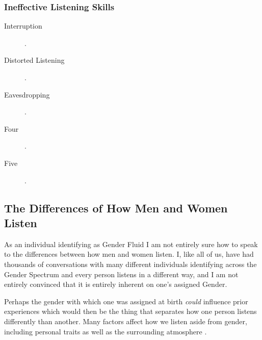 \documentclass[stu,12pt]{apa7}
\begin{document}
      \subsubsection{Ineffective Listening Skills}
          \begin{description}
            \item[Interruption]
              \parencite[pp. 351--352]{noauthor_communication_2013}.
            \item[Distorted Listening]
              \parencite[pp. 352]{noauthor_communication_2013}.
            \item[Eavesdropping]
              \parencite[pp. ]{noauthor_communication_2013}.
            \item[Four]
              \parencite[pp. ]{noauthor_communication_2013}.
            \item[Five]
              \parencite[pp. ]{noauthor_communication_2013}.
          \end{description}


    \subsection{The Differences of How Men and Women Listen}
      As an individual identifying as Gender Fluid I am not entirely sure how
        to speak to the differences between how men and women listen. I, like
        all of us, have had thousands of conversations with many different
        individuals identifying across the Gender Spectrum and every person
        listens in a different way, and I am not entirely convinced that it is
        entirely inherent on one's assigned Gender.

      Perhaps the gender with which one was assigned at birth \textit{could}
        influence prior experiences which would then be the thing that separates
        how one person listens differently than another. Many factors affect
        how we listen aside from gender, including personal traits as well as
        the surrounding atmosphere \parencite[pp. 6]{caspersz_can_nodate}.




  \newpage
  \printbibliography[%
    title={References},%
    heading={bibintoc},%
    notcategory={consulted}%
  ]

  \newpage
  \nocite{*}
  \printbibliography[%
    title={Additional References},%
    heading={bibintoc},%
    category={consulted}%
  ]
\end{document}
